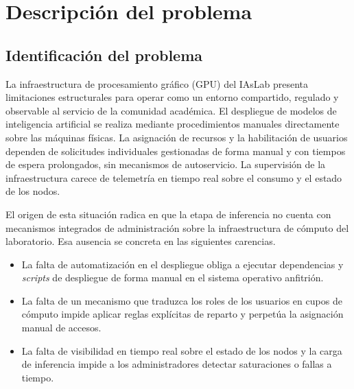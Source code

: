 %
%
\chapter{Descripción del problema}\label{cha:descripcion-problema}

\section{Identificación del problema}

La infraestructura de procesamiento gráfico (GPU) del IAsLab presenta limitaciones estructurales para operar como un entorno compartido, regulado y observable al servicio de la comunidad académica. El despliegue de modelos de inteligencia artificial se realiza mediante procedimientos manuales directamente sobre las máquinas físicas. La asignación de recursos y la habilitación de usuarios dependen de solicitudes individuales gestionadas de forma manual y con tiempos de espera prolongados, sin mecanismos de autoservicio. La supervisión de la infraestructura carece de telemetría en tiempo real sobre el consumo y el estado de los nodos.

El origen de esta situación radica en que la etapa de inferencia no cuenta con mecanismos integrados de administración sobre la infraestructura de cómputo del laboratorio. Esa ausencia se concreta en las siguientes carencias.
\begin{itemize}
  \item La falta de automatización en el despliegue obliga a ejecutar dependencias y \emph{scripts} de despliegue de forma manual en el sistema operativo anfitrión.
  \item La falta de un mecanismo que traduzca los roles de los usuarios en cupos de cómputo impide aplicar reglas explícitas de reparto y perpetúa la asignación manual de accesos.
  \item La falta de visibilidad en tiempo real sobre el estado de los nodos y la carga de inferencia impide a los administradores detectar saturaciones o fallas a tiempo.
\end{itemize}

